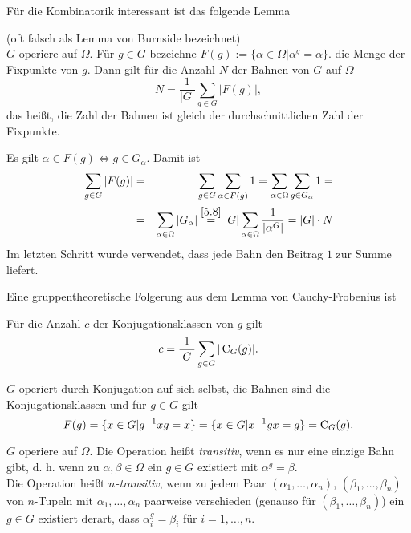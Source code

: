 F\"ur die Kombinatorik interessant ist das folgende Lemma
\begin{satz}
 (oft falsch als Lemma von Burnside bezeichnet)\\
$G$ operiere auf $\Omega$. F\"ur $g\in G$ bezeichne $F(g):=\lbrace \alpha \in \Omega|\alpha^g=\alpha \rbrace$. die Menge der Fixpunkte von $g$. Dann gilt f\"ur die Anzahl $N$ der Bahnen von $G$ auf $\Omega$ $$N=\frac{1}{|G|}\sum_{g\in G}{|F(g)|},$$ das hei\ss{}t, die Zahl der Bahnen ist gleich der durchschnittlichen Zahl der Fixpunkte.
\end{satz}
\begin{beweis}
 Es gilt $\alpha\in F(g) \Longleftrightarrow g\in G_\alpha$. Damit ist 
\begin{eqnarray*}
 \sum_{g\in G}{|F(g)|}&=&\sum_{g\in G}\sum_{\alpha\in F(g)}{1}=\sum_{\alpha\in\Omega}\sum_{g\in G_\alpha}{1}=\\&=&\sum_{\alpha\in\Omega}{|G_\alpha|}\stackrel{\ref{5.8}}{=}|G|\sum_{\alpha\in\Omega}\frac{1}{|\alpha^G|}=|G|\cdot N
\end{eqnarray*}
Im letzten Schritt wurde verwendet, dass jede Bahn den Beitrag $1$ zur Summe liefert.
\end{beweis}

Eine gruppentheoretische Folgerung aus dem Lemma von Cauchy-Frobenius ist 
\begin{folgerung}
 F\"ur die Anzahl $c$ der Konjugationsklassen von $g$ gilt $$c=\frac{1}{|G|}\sum_{g\in G}|\operatorname{C}_G(g)|.$$
\end{folgerung}
\begin{beweis}
 $G$ operiert durch Konjugation auf sich selbst, die Bahnen sind die Konjugationsklassen und f\"ur $g\in G$ gilt
$$F(g)=\lbrace x\in G|g^{-1}xg=x\rbrace = \lbrace x\in G|x^{-1}gx=g \rbrace = \operatorname{C}_G(g).$$
\end{beweis}

\begin{definition}[transitiv]
$G$ operiere auf $\Omega$. Die Operation hei\ss{}t \emph{transitiv}, wenn es nur eine einzige Bahn gibt, d. h. wenn zu $\alpha,\beta \in \Omega$ ein $g\in G$ existiert mit $\alpha^g=\beta$.\\
Die Operation hei\ss{}t \emph{$n$-transitiv}, wenn zu jedem Paar $(\alpha_1,\ldots,\alpha_n)$, $(\beta_1,\ldots,\beta_n)$ von $n$-Tupeln mit $\alpha_1,\ldots,\alpha_n$ paarweise verschieden (genauso f\"ur $(\beta_1,\ldots,\beta_n)$) ein $g\in G$ existiert derart, dass $\alpha_i^g=\beta_i$ f\"ur $i=1,\ldots,n$.
\end{definition}

